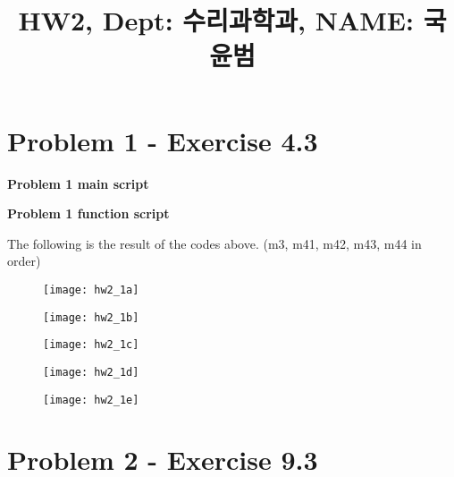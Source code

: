 \documentclass[11pt]{article} %
\title{HW2, Dept: 수리과학과, NAME: 국윤범}
\date{} %
\theoremstyle{definition}
\begin{document}
\maketitle


\section*{Problem 1 - Exercise 4.3}

\textbf{Problem 1 main script}

\textbf{Problem 1 function script}


The following is the result of the codes above. (m3, m41, m42, m43, m44 in order)

\begin{figure}[htbp]
\begin{center}
    \texttt{[image: hw2\_1a]}
\end{center}
\begin{center}
    \texttt{[image: hw2\_1b]}
\end{center}
\begin{center}
    \texttt{[image: hw2\_1c]}
\end{center}
\end{figure}
\newpage

\begin{figure}
\begin{center}
    \texttt{[image: hw2\_1d]}
\end{center}
\begin{center}
    \texttt{[image: hw2\_1e]}
\end{center}
\end{figure}


\section*{Problem 2 - Exercise 9.3}

\end{document}
